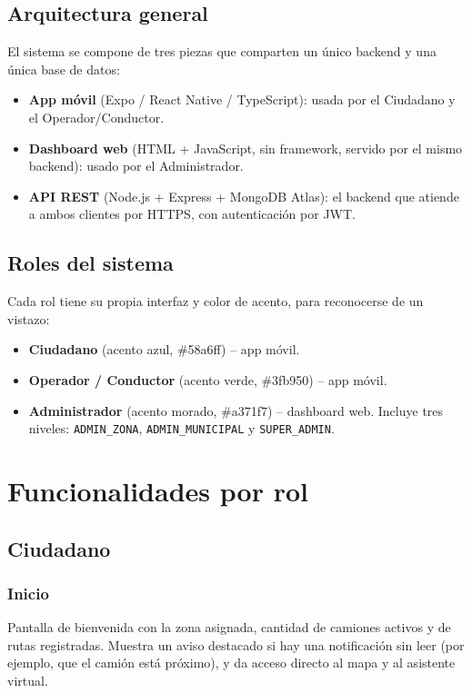 \documentclass[11pt,a4paper]{article}
\begin{document}
\subsection{Arquitectura general}
El sistema se compone de tres piezas que comparten un único backend y una única base de datos:

\begin{itemize}
    \item \textbf{App móvil} (Expo / React Native / TypeScript): usada por el Ciudadano y el Operador/Conductor.
    \item \textbf{Dashboard web} (HTML + JavaScript, sin framework, servido por el mismo backend): usado por el Administrador.
    \item \textbf{API REST} (Node.js + Express + MongoDB Atlas): el backend que atiende a ambos clientes por HTTPS, con autenticación por JWT.
\end{itemize}

\subsection{Roles del sistema}
Cada rol tiene su propia interfaz y color de acento, para reconocerse de un vistazo:

\begin{itemize}
    \item \textbf{Ciudadano} (acento azul, \#58a6ff) -- app móvil.
    \item \textbf{Operador / Conductor} (acento verde, \#3fb950) -- app móvil.
    \item \textbf{Administrador} (acento morado, \#a371f7) -- dashboard web. Incluye tres niveles: \texttt{ADMIN\_ZONA}, \texttt{ADMIN\_MUNICIPAL} y \texttt{SUPER\_ADMIN}.
\end{itemize}

\section{Funcionalidades por rol}

\subsection{Ciudadano}

\subsubsection{Inicio}
Pantalla de bienvenida con la zona asignada, cantidad de camiones activos y de rutas registradas. Muestra un aviso destacado si hay una notificación sin leer (por ejemplo, que el camión está próximo), y da acceso directo al mapa y al asistente virtual.
\end{document}
